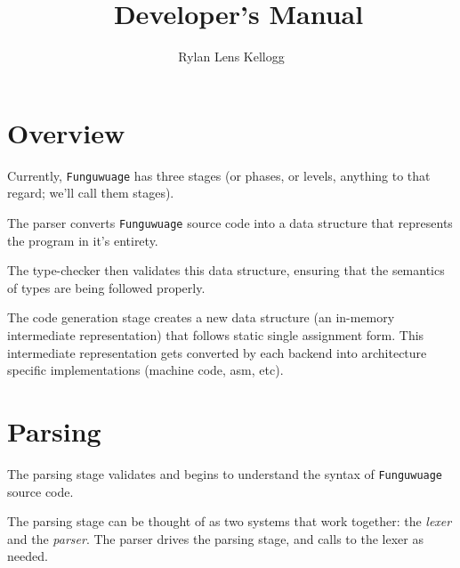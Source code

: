 \documentclass[12pt]{report}
\title  {\langname\ Developer's Manual}
\author {Rylan Lens Kellogg}
\newcommand{\langname}{Funguwuage}
\newcommand{\lang}{\texttt{\langname} }
\begin{document}
\pagestyle{fancy}
\renewcommand{\chaptermark}[1]{\markboth{#1}{#1}}
\fancyhf{}
\fancyhead[C]{\leftmark}
\fancyfoot[C]{\thepage}

\hypersetup{pageanchor=false}
\begin{titlepage}
  \maketitle
\end{titlepage}

\chapter{Overview}
\label{ch:Overview}

Currently, \lang has three stages (or phases, or levels, anything to that regard; we'll call them stages).

\begin{center}
\end{center}

The parser converts \lang source code into a data structure that represents the program in it's entirety.

The type-checker then validates this data structure, ensuring that the semantics of types are being followed properly.

The code generation stage creates a new data structure (an in-memory intermediate representation) that follows static single assignment form.
This intermediate representation gets converted by each backend into
architecture specific implementations (machine code, asm, etc).

\chapter{Parsing}
\label{ch:parsing}

The parsing stage validates and begins to understand the syntax of \lang source code.

The parsing stage can be thought of as two systems that work together: the \emph{lexer} and the \emph{parser}. The parser drives the parsing stage, and calls to the lexer as needed.
\end{document}
